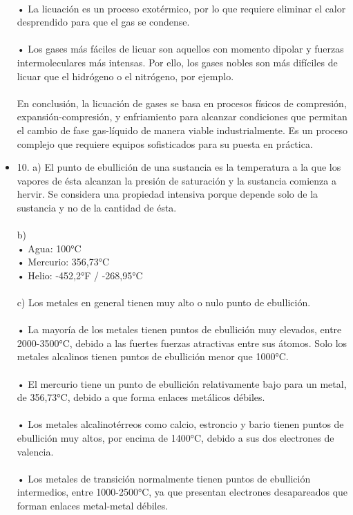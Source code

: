 \documentclass{article}
\begin{document}
\begin{itemize}
\\
• La licuación es un proceso exotérmico, por lo que requiere eliminar el calor desprendido para que el gas se condense.\\
\\
• Los gases más fáciles de licuar son aquellos con momento dipolar y fuerzas intermoleculares más intensas. Por ello, los gases nobles son más difíciles de licuar que el hidrógeno o el nitrógeno, por ejemplo.\\
\\
En conclusión, la licuación de gases se basa en procesos físicos de compresión, expansión-compresión, y enfriamiento para alcanzar condiciones que permitan el cambio de fase gas-líquido de manera viable industrialmente. Es un proceso complejo que requiere equipos sofisticados para su puesta en práctica.\\
\item{10.}
a) El punto de ebullición de una sustancia es la temperatura a la que los vapores de ésta alcanzan la presión de saturación y la sustancia comienza a hervir. Se considera una propiedad intensiva porque depende solo de la sustancia y no de la cantidad de ésta.\\
\\
b)\\
• Agua: 100°C\\
• Mercurio: 356,73°C\\
• Helio: -452,2°F / -268,95°C\\
\\
c) Los metales en general tienen muy alto o nulo punto de ebullición.\\
\\
• La mayoría de los metales tienen puntos de ebullición muy elevados, entre 2000-3500°C, debido a las fuertes fuerzas atractivas entre sus átomos. Solo los metales alcalinos tienen puntos de ebullición menor que 1000°C.\\
\\
• El mercurio tiene un punto de ebullición relativamente bajo para un metal, de 356,73°C, debido a que forma enlaces metálicos débiles.\\
\\
• Los metales alcalinotérreos como calcio, estroncio y bario tienen puntos de ebullición muy altos, por encima de 1400°C, debido a sus dos electrones de valencia.\\
\\
• Los metales de transición normalmente tienen puntos de ebullición intermedios, entre 1000-2500°C, ya que presentan electrones desapareados que forman enlaces metal-metal débiles.\\

\end{itemize}
\end{document}
